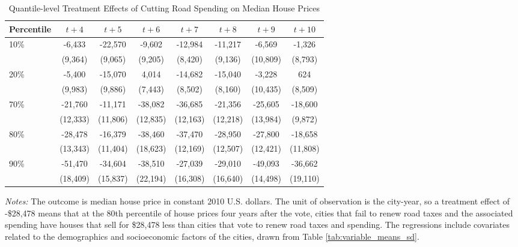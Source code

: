 \begin{table}[ht]
    \hspace{-1cm}
    \caption{Quantile-level Treatment Effects of Cutting Road Spending on Median House Prices}
    \label{tab:quantile_tes}
    \begin{tabular}{p{1.5cm}ccccccc}
        \hline
        Percentile & $t + 4$ & $t + 5$ & $t + 6$ & $t + 7$ & $t + 8$ & $t + 9$ & $t + 10$ \\
        \hline
        10\% & -6,433 & -22,570 & -9,602 & -12,984 & -11,217 & -6,569 & -1,326 \\
        & (9,364) & (9,065) & (9,205) & (8,420) & (9,136) & (10,809) & (8,793) \\
        20\% & -5,400 & -15,070 & 4,014 & -14,682 & -15,040 & -3,228 & 624 \\
        & (9,983) & (9,886) & (7,443) & (8,502) & (8,160) & (10,435) & (8,509) \\
        70\% & -21,760 & -11,171 & -38,082 & -36,685 & -21,356 & -25,605 & -18,600 \\
        & (12,333) & (11,806) & (12,835) & (12,163) & (12,218) & (13,984) & (9,872) \\
        80\% & -28,478 & -16,379 & -38,460 & -37,470 & -28,950 & -27,800 & -18,658 \\
        & (13,343) & (11,404) & (18,623) & (12,169) & (12,507) & (12,421) & (11,808) \\
        90\% & -51,470 & -34,604 & -38,510 & -27,039 & -29,010 & -49,093 & -36,662 \\
        & (18,409) & (15,837) & (22,194) & (16,308) & (16,640) & (14,498) & (19,110) \\
        \hline
    \end{tabular}
    \begin{tablenotes}
        \small
        \item \textit{Notes:} The outcome is median house price in constant 2010 U.S. dollars. The unit of observation is the city-year, so a treatment effect of -\$28,478 means that at the 80th percentile of house prices four years after the vote, cities that fail to renew road taxes and the associated spending have houses that sell for \$28,478 less than cities that vote to renew road taxes and spending. The regressions include covariates related to the demographics and socioeconomic factors of the cities, drawn from Table \ref{tab:variable_means_sd}.
    \end{tablenotes}
\end{table}

